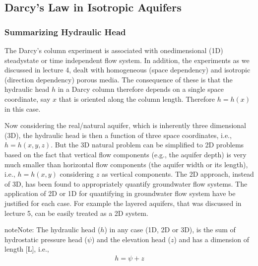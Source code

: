 \documentclass[letterpaper,10pt,english]{sphinxmanual}
\begin{document}
\subsection{Darcy’s Law in Isotropic Aquifers}
\label{\detokenize{contents/flow/lecture_06/16_darcy_law_3D:darcy-s-law-in-isotropic-aquifers}}

\subsubsection{Summarizing Hydraulic Head}
\label{\detokenize{contents/flow/lecture_06/16_darcy_law_3D:summarizing-hydraulic-head}}
The Darcy’s column experiment is associated with one\sphinxhyphen{}dimensional (1D) steady\sphinxhyphen{}state or time independent flow system. In addition, the experiments as we discussed in lecture 4, dealt with homogeneous (space dependency) and isotropic (direction dependency)  porous media. The consequence of these is that the hydraulic head \(h\) in a Darcy column therefore depends on a single space coordinate, say \(x\) that is oriented along the column length. Therefore \(h = h(x)\) in this case.

Now considering the real/natural aquifer, which is inherently three dimensional (3D), the hydraulic head is then a function of three space coordinates, i.e., \(h = h(x,y,z)\). But the 3D natural problem can be simplified to 2D problems based on the fact that vertical flow components (e.g., the aquifer depth) is very much smaller than horizontal flow components (the aquifer width or its length), i.e., \(h = h(x,y)\) considering \(z\) as vertical components. The 2D approach, instead of 3D, has been found to appropriately quantify groundwater flow systems. The application of 2D or 1D for quantifying in groundwater flow system have be justified for each case.  For example the layered aquifers, that was discussed in lecture 5, can be easily treated as a 2D system.

\begin{sphinxadmonition}{note}{Note:}
The hydraulic head (\(h\)) in any case (1D, 2D or 3D), is the sum of hydrostatic pressure head (\(\psi\)) and the elevation head (\(z\)) and has a dimension of length {[}L{]}, i.e.,
\begin{equation*}
\begin{split}
h = \psi + z
\end{split}
\end{equation*}\end{sphinxadmonition}
\end{document}
